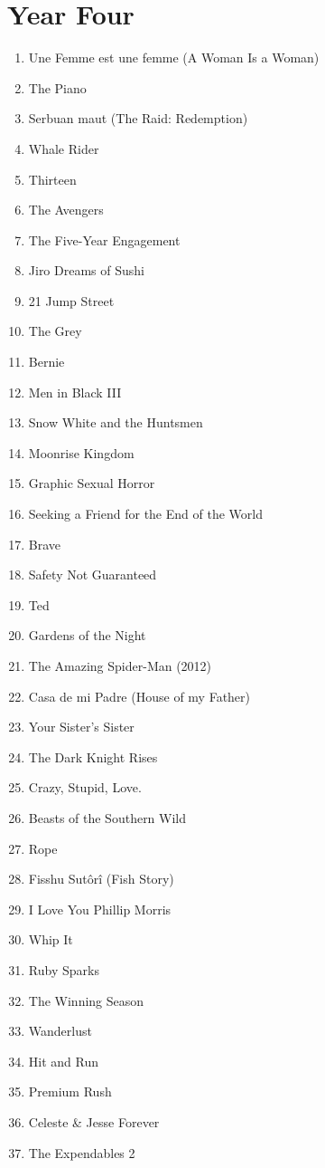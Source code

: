 \documentclass[11pt]{article}
\begin{document}
\section{Year Four}
\begin{enumerate}
\item Une Femme est une femme (A Woman Is a Woman)
\item The Piano
\item Serbuan maut (The Raid: Redemption)
\item Whale Rider
\item Thirteen
\item The Avengers
\item The Five-Year Engagement
\item Jiro Dreams of Sushi
\item 21 Jump Street
\item The Grey
\item Bernie
\item Men in Black III
\item Snow White and the Huntsmen
\item Moonrise Kingdom
\item Graphic Sexual Horror
\item Seeking a Friend for the End of the World
\item Brave
\item Safety Not Guaranteed
\item Ted
\item Gardens of the Night
\item The Amazing Spider-Man (2012)
\item Casa de mi Padre (House of my Father)
\item Your Sister’s Sister
\item The Dark Knight Rises
\item Crazy, Stupid, Love.
\item Beasts of the Southern Wild
\item Rope
\item Fisshu Sutôrî (Fish Story)
\item I Love You Phillip Morris
\item Whip It
\item Ruby Sparks
\item The Winning Season
\item Wanderlust
\item Hit and Run
\item Premium Rush
\item Celeste \& Jesse Forever
\item The Expendables 2

\end{enumerate}
\end{document}
